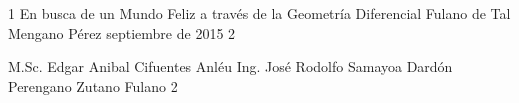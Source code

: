 \documentclass[letterpaper,12pt]{thesisECFM}
\begin{document}
\datosThesis%
{1}%
{ En busca de un Mundo Feliz a través de la Geometría Diferencial}%
{Fulano de Tal}%
{Mengano Pérez}%
{septiembre de 2015}		%
{2}							%

\examenPrivado%
{M.Sc. Edgar Anibal Cifuentes Anléu}%
{Ing. José Rodolfo Samayoa Dardón}%
{Perengano}%
{Zutano}%
{Fulano 2}%

{\onehalfspacing	%




\par}
 
\frontmatter    %

{\onehalfspacing	%

\tableofcontents    %







\mainmatter     %
%
%

{\backmatter     %


  {} %
  

  \todos
}


%

\par}               %
\end{document}
